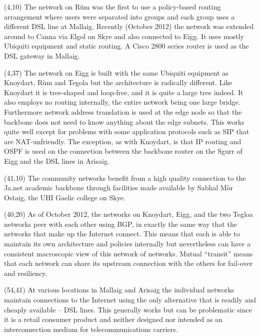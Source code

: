 \documentclass[noborder,onecolumn]{netmap}
\begin{document}
\begin{textblock}{10}(4,10)
  \linespread{1.0}
  \tiny
  The network on Rùm was the first to use a policy-based routing
  arrangement where users were separated into groups and each group uses
  a different DSL line at Mallaig. Recently (October 2012) the network
  was extended around to Canna via Elgol on Skye and also connected to
  Eigg. It uses mostly Ubiquiti equipment and static routing. A Cisco
  2800 series router is used as the DSL gateway in Mallaig.
\end{textblock}
\begin{textblock}{10}(4,37)
  \linespread{1.0}
  \tiny
  The network on Eigg is built with the same Ubiquiti equipment as
  Knoydart, Rùm and Tegola but the architecture is radically
  different. Like Knoydart it is tree-shaped and loop-free, and it is
  quite a large tree indeed. It also employs no routing internally,
  the entire network being one large bridge. Furthermore network
  address translation is used at the edge node so that the backbone
  does not need to know anything about the edge subnets. This works
  quite well except for problems with some application protocols 
  such as SIP that are NAT-unfriendly. The exception, as with
  Knoydart, is that IP routing and OSPF is used on the connection
  between the backbone router on the Sgurr of Eigg and the DSL lines
  in Arisaig.  
\end{textblock}
\begin{textblock}{10}(41,10)
  \linespread{1.0}
  \tiny
  The community networks benefit from a high quality connection to the
  Ja.net academic backbone through facilities made available by Sabhal
  Mòr Ostaig, the UHI Gaelic college on Skye.
\end{textblock}
\begin{textblock}{10}(40,20)
  \linespread{1.0}
  \tiny
  As of October 2012, the networks on Knoydart, Eigg, and the two
  Tegloa networks peer with each other using BGP, in exactly the same
  way that the networks that make up the Internet connect. This means
  that each is able to maintain its own architecture and policies
  internally but nevertheless can have a consistent macroscopic view
  of this network of networks. Mutual ``transit'' means that each
  network can share its upstream connection with the others for
  fail-over and resiliency.
\end{textblock}
\begin{textblock}{10}(54,41)
  \linespread{1.0}
  \tiny
  At various locations in Mallaig and Arisaig the individual networks
  maintain connections to the Internet using the only alternative that
  is readily and cheaply available -- DSL lines. This generally works
  but can be problematic since it is a retail consumer product and
  neither designed nor intended as an interconnection medium for
  telecommunications carriers.
\end{textblock}
\end{document}
